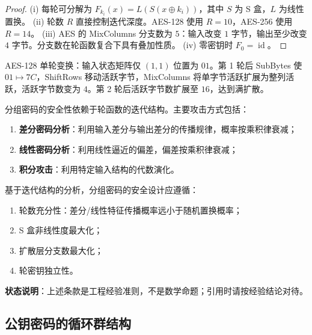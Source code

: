 \begin{proof}
(i) 每轮可分解为 \(F_{k_i}(x)=L(S(x\oplus k_i))\)，其中 \(S\) 为 S 盒，\(L\) 为线性置换。
(ii) 轮数 \(R\) 直接控制迭代深度。AES-128 使用 \(R=10\)，AES-256 使用 \(R=14\)。
(iii) AES 的 MixColumns 分支数为 \(5\)：输入改变 \(1\) 字节，输出至少改变 \(4\) 字节。分支数在轮函数复合下具有叠加性质。
(iv) 零密钥时 \(F_0=\operatorname{id}\)。
\end{proof}

\begin{example}\label{ex:aes_diffusion}
AES-128 单轮变换：输入状态矩阵仅 \((1,1)\) 位置为 \(01\)。第 1 轮后 SubBytes 使 \(01\mapsto7C\)，ShiftRows 移动活跃字节，MixColumns 将单字节活跃扩展为整列活跃，活跃字节数变为 \(4\)。第 2 轮后活跃字节数扩展至 \(16\)，达到满扩散。
\end{example}

\begin{definition}[分组密码的周期攻击]\label{def:block_cipher_period_attack}
分组密码的安全性依赖于轮函数的迭代结构。主要攻击方式包括：
\begin{enumerate}[label=(\roman*)]
    \item \textbf{差分密码分析}：利用输入差分与输出差分的传播规律，概率按乘积律衰减；
    \item \textbf{线性密码分析}：利用线性逼近的偏差，偏差按乘积律衰减；
    \item \textbf{积分攻击}：利用特定输入结构的代数演化。
\end{enumerate}
\end{definition}

\begin{remark}\label{prop:block_cipher_security}
基于迭代结构的分析，分组密码的安全设计应遵循：
\begin{enumerate}[label=(\roman*)]
    \item 轮数充分性：差分/线性特征传播概率远小于随机置换概率；
    \item S 盒非线性度最大化；
    \item 扩散层分支数最大化；
    \item 轮密钥独立性。
\end{enumerate}
\textbf{状态说明}：上述条款是工程经验准则，不是数学命题；引用时请按经验结论对待。
\end{remark}

\subsection{公钥密码的循环群结构}

